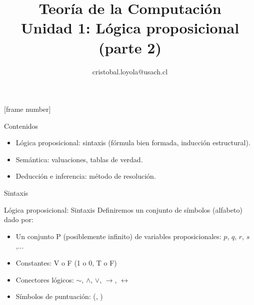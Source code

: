 \documentclass{beamer}
\begin{document}
\title[Lógica proposicional]{Teoría de la Computación \\ Unidad 1: Lógica
  proposicional (parte 2)} \author[Teoría de la
Computación]{cristobal.loyola@usach.cl} \date{}


\frame{\titlepage}

[frame number]

\begin{frame}{Contenidos}

  \begin{itemize}
    \item Lógica proposicional: sintaxis (fórmula bien formada, inducción
          estructural).
    \item Semántica: valuaciones, tablas de verdad.
    \item Deducción e inferencia: método de resolución.
  \end{itemize}

\end{frame}


\begin{frame}[plain,c]
  \vspace{1cm}
  \begin{center}
    \Huge Sintaxis
  \end{center}
\end{frame}


\begin{frame}{Lógica proposicional: Sintaxis}
  Definiremos un conjunto de símbolos (alfabeto) dado por:
  \begin{itemize}[<+->]
    \item Un conjunto P (posiblemente infinito) de variables proposicionales: $p$, $q$, $r$, $s$,...
    \item Constantes: V o F (1 o 0, T o F)
    \item Conectores lógicos: $\sim$, $\land$, $\vee$, $\rightarrow$,
          $\leftrightarrow$
    \item Símbolos de puntuación: (, )
  \end{itemize}
\end{frame}
\end{document}
